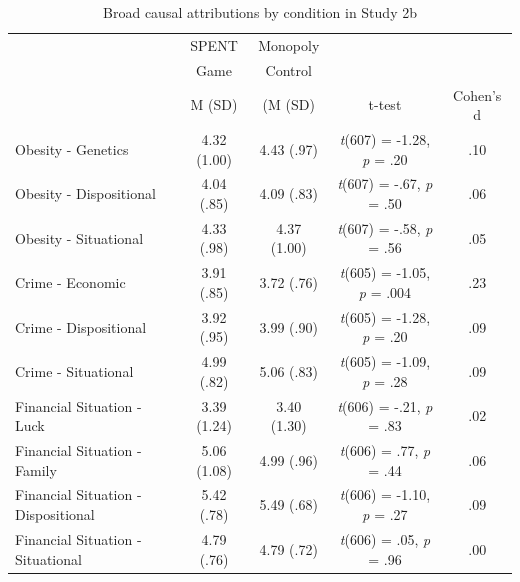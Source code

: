 \documentclass{sfuthesis}
\begin{document}
\begin{table}[h]
  \begin{center}
    \caption{Broad causal attributions by condition in Study 2b}
    \label{tab:fifthtable}
    \begin{tabular}{l c c c c}
    \hline
      & \multicolumn{1}{c}{SPENT} & \multicolumn{1}{c}{Monopoly} & & \\
      & \multicolumn{1}{c}{Game} & \multicolumn{1}{c}{Control} & & \\\cmidrule{2-3}
      & \multicolumn{1}{c}{M (SD)} & \multicolumn{1}{c}{(M (SD)} & t-test & Cohen's d\\
      \hline
      Obesity - Genetics & \multicolumn{1}{c}{4.32 (1.00)} & \multicolumn{1}{c}{4.43 (.97)} & \multicolumn{1}{c}{\textit{t}(607) = -1.28, \textit{p} = .20} & .10\\
      Obesity - Dispositional & \multicolumn{1}{c}{4.04 (.85)} & \multicolumn{1}{c}{4.09 (.83)} & \multicolumn{1}{c}{\textit{t}(607) = -.67, \textit{p} = .50} & .06\\
      Obesity - Situational & \multicolumn{1}{c}{4.33 (.98)} & \multicolumn{1}{c}{4.37 (1.00)} & \multicolumn{1}{c}{\textit{t}(607) = -.58, \textit{p} = .56} & .05\\
      Crime - Economic & \multicolumn{1}{c}{3.91 (.85)} & \multicolumn{1}{c}{3.72 (.76)} & \multicolumn{1}{c}{\textit{t}(605) = -1.05, \textit{p} = .004} & .23\\
      Crime - Dispositional & \multicolumn{1}{c}{3.92 (.95)} & \multicolumn{1}{c}{3.99 (.90)} & \multicolumn{1}{c}{\textit{t}(605) = -1.28, \textit{p} = .20} & .09\\
      Crime - Situational & \multicolumn{1}{c}{4.99 (.82)} & \multicolumn{1}{c}{5.06 (.83)} & \multicolumn{1}{c}{\textit{t}(605) = -1.09, \textit{p} = .28} & .09\\
      Financial Situation - Luck & \multicolumn{1}{c}{3.39 (1.24)} & \multicolumn{1}{c}{3.40 (1.30)} & \multicolumn{1}{c}{\textit{t}(606) = -.21, \textit{p} = .83} & .02\\
      Financial Situation - Family & \multicolumn{1}{c}{5.06 (1.08)} & \multicolumn{1}{c}{4.99 (.96)} & \multicolumn{1}{c}{\textit{t}(606) = .77, \textit{p} = .44} & .06\\
      Financial Situation - Dispositional & \multicolumn{1}{c}{5.42 (.78)} & \multicolumn{1}{c}{5.49 (.68)} & \multicolumn{1}{c}{\textit{t}(606) = -1.10, \textit{p} = .27} & .09\\
      Financial Situation - Situational & \multicolumn{1}{c}{4.79 (.76)} & \multicolumn{1}{c}{4.79 (.72)} & \multicolumn{1}{c}{\textit{t}(606) = .05, \textit{p} = .96} & .00\\

\end{tabular}
\end{center}
\end{table}
\end{document}

